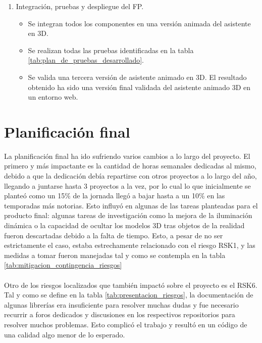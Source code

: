 \documentclass{subfiles}
\begin{document}
\begin{enumerate}
\begin{enumerate}
                \item Integración, pruebas y despliegue del FP.
                \begin{itemize}
                    \item Se integran todos los componentes en una versión animada del asistente en 3D.
                    \item Se realizan todas las pruebas identificadas en la tabla \ref{tab:plan_de_pruebas_desarrollado}.
                    \item Se valida una tercera versión de asistente animado en 3D. El resultado obtenido ha sido una versión final validada del asistente animado 3D en un entorno web. 
                \end{itemize}
            \end{enumerate}
            
        \end{enumerate}

        \section{Planificación final}
        \label{sec:planificacion_final}

        La planificación final ha ido sufriendo varios cambios a lo largo del proyecto. El primero y más impactante es la cantidad de horas semanales dedicadas al mismo, debido a que la dedicación debía repartirse con otros proyectos a lo largo del año, llegando a juntarse hasta 3 proyectos a la vez, por lo cual lo que inicialmente se planteó como un 15\% de la jornada llegó a bajar hasta a un 10\% en las temporadas más notorias. Esto influyó en algunas de las tareas planteadas para el producto final: algunas tareas de investigación como la mejora de la iluminación dinámica o la capacidad de ocultar los modelos 3D tras objetos de la realidad fueron descartadas debido a la falta de tiempo. Esto, a pesar de no ser estrictamente el caso, estaba estrechamente relacionado con el riesgo RSK1, y las medidas a tomar fueron manejadas tal y como se contempla en la tabla \ref{tab:mitigacion_contingencia_riesgos}

        \paragraph{}
        Otro de los riesgos localizados que también impactó sobre el proyecto es el RSK6. Tal y como se define en la tabla \ref{tab:presentacion_riesgos}, la documentación de algunas librerías era insuficiente para resolver muchas dudas y fue necesario recurrir a foros dedicados y discusiones en los respectivos repositorios para resolver muchos problemas. Esto complicó el trabajo y resultó en un código de una calidad algo menor de lo esperado.
\end{document}
